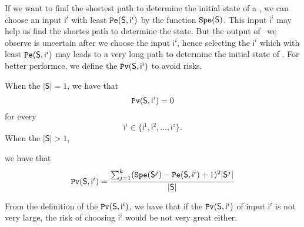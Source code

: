 If we want to find the shortest path to determine the initial state of a \BCN, we can choose an input $\mathsf{ i}^{i}$ with least ${\tt Pe}(\mathsf{S}, \mathsf{ i}^{i})$ by the function ${\tt Spe}(\mathsf{S})$. This input $\mathsf{ i}^{i}$ may help us find the shortes path to determine the state. But the output of \BCNs\ we observe is uncertain after we choose the input $\mathsf{ i}^{i}$, hence selecting the $\mathsf{ i}^{i}$ which with least ${\tt Pe}(\mathsf{S}, \mathsf{ i}^{i})$ may leads to a very long path to determine the initial state of \BCNs. For better performce, we define the ${\tt Pv}(\mathsf{S}, \mathsf{ i}^{i})$ to avoid risks.
\begin{definition} 
When the $|\mathsf{S}|=1$, we have that
\[{\tt Pv}(\mathsf{S}, \mathsf{ i}^{i})=0\]  for every \[\mathsf{ i}^{i} \in \{\mathsf{ i}^{1},\mathsf{ i}^{2},\ldots, \mathsf{ i}^{z}\}.\]  When the $|\mathsf{S}|>1$, 

we have that\\ 
\begin{equation}
\begin{split}
{\tt Pv}(\mathsf{S}, \mathsf{ i}^{i})=\frac{\sum_{j=1}^k ({\tt Spe}(\mathsf{S}^{j})-{\tt Pe}(\mathsf{S}, \mathsf{ i}^{i})+1)^2 |\mathsf{S}^{j}|}{ |\mathsf{S}|}
\end{split}
\end{equation}
\end{definition}

From the definition of the ${\tt Pv}(\mathsf{S}, \mathsf{ i}^{i})$, we have that if the ${\tt Pv}(\mathsf{S}, \mathsf{ i}^{i})$ of input $\mathsf{ i}^{i}$ is not very large, the risk of choosing $\mathsf{ i}^{i}$ would be not very great either.
